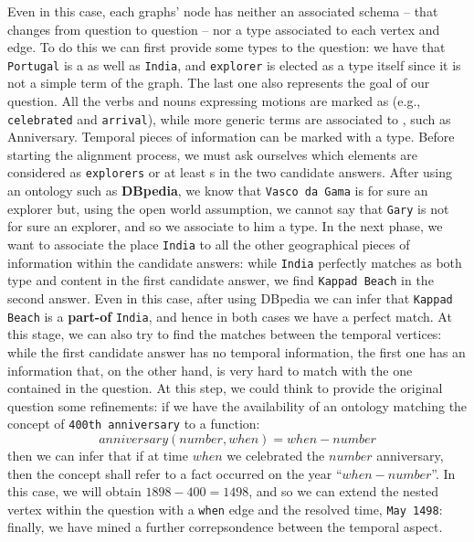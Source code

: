 \begin{example}
Even in this case, each graphs' node has neither an associated schema -- that changes from question to question -- nor a type associated to each vertex and edge. To do this we can first provide some types to the question: we have that \texttt{Portugal} is a   as well as \texttt{India}, and \texttt{explorer} is elected as a type itself since it is not a simple term of the graph. The last one also represents the goal of our question. All the verbs and nouns expressing motions are marked as  (e.g., \texttt{celebrated} and \texttt{arrival}), while more generic terms are associated to , such as Anniversary. Temporal pieces of information can be marked with a  type. Before starting the alignment process, we must ask ourselves which elements are considered as \texttt{explorers} or at least s in the two candidate answers. After using an ontology such as \textbf{DBpedia}, we know that \texttt{Vasco da Gama} is for sure an explorer but, using the open world assumption, we cannot say that \texttt{Gary} is not for sure an explorer, and so we associate to him a  type. In the next phase, we want to associate the place  \texttt{India} to all the other geographical pieces of information within the candidate answers: while \texttt{India} perfectly matches as both type and content in the first candidate answer, we find \texttt{Kappad Beach} in the second answer. Even in this case, after using DBpedia we can infer that \texttt{Kappad Beach} is  a \textbf{part-of} \texttt{India}, and hence in both cases we have a perfect match. At this stage, we can also try to find the matches between the temporal vertices: while the first candidate answer has no temporal information, the first one has an information that, on the other hand, is very hard to match with the one contained in the question. At this step, we could think to provide the original question some refinements: if we have the availability of an ontology matching the concept of \texttt{400th anniversary} to a function: \[anniversary(number,when)=when-number\] then we can infer that if at time $when$ we celebrated the $number$ anniversary, then the concept shall refer to a fact occurred on the year ``$when-number$''. In this case, we will obtain $1898-400=1498$, and so we can extend the nested vertex within the question with a \texttt{when} edge and the resolved time, \texttt{May 1498}: finally, we have mined a further correpsondence between the temporal aspect.
	


\end{example}
